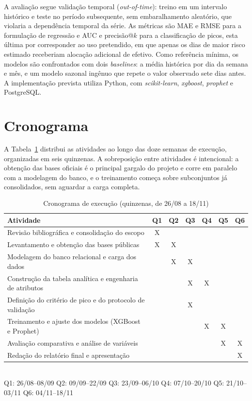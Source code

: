 \documentclass[12pt]{article}
\begin{document}
A avaliação segue validação temporal (\emph{out-of-time}): treino em um
intervalo histórico e teste no período subsequente, sem embaralhamento
aleatório, que violaria a dependência temporal da série. As métricas são MAE e
RMSE para a formulação de regressão e AUC e precisão@$k$ para a classificação
de picos, esta última por corresponder ao uso pretendido, em que apenas os dias
de maior risco estimado receberiam alocação adicional de efetivo. Como
referência mínima, os modelos são confrontados com dois \emph{baselines}: a
média histórica por dia da semana e mês, e um modelo sazonal ingênuo que repete
o valor observado sete dias antes. A implementação prevista utiliza Python, com
\emph{scikit-learn}, \emph{xgboost}, \emph{prophet} e PostgreSQL.

\section{Cronograma}

A Tabela~\ref{tab:cronograma} distribui as atividades ao longo das doze semanas
de execução, organizadas em seis quinzenas. A sobreposição entre atividades é
intencional: a obtenção das bases oficiais é o principal gargalo do projeto e
corre em paralelo com a modelagem do banco, e o treinamento começa sobre
subconjuntos já consolidados, sem aguardar a carga completa.

\begin{table}[ht]
\centering
\caption{Cronograma de execução (quinzenas, de 26/08 a 18/11)}
\label{tab:cronograma}
\small
\begin{tabular}{@{}lcccccc@{}}
\toprule
\textbf{Atividade} & \textbf{Q1} & \textbf{Q2} & \textbf{Q3} & \textbf{Q4} &
\textbf{Q5} & \textbf{Q6} \\
\midrule
Revisão bibliográfica e consolidação do escopo & X & & & & & \\
Levantamento e obtenção das bases públicas & X & X & & & & \\
Modelagem do banco relacional e carga dos dados & & X & X & & & \\
Construção da tabela analítica e engenharia de atributos & & & X & X & & \\
Definição do critério de pico e do protocolo de validação & & & X & & & \\
Treinamento e ajuste dos modelos (XGBoost e Prophet) & & & & X & X & \\
Avaliação comparativa e análise de variáveis & & & & & X & X \\
Redação do relatório final e apresentação & & & & & & X \\
\bottomrule
\end{tabular}
\\[4pt]
\footnotesize
Q1: 26/08--08/09 \quad Q2: 09/09--22/09 \quad Q3: 23/09--06/10 \quad
Q4: 07/10--20/10 \quad Q5: 21/10--03/11 \quad Q6: 04/11--18/11
\end{table}
\end{document}
